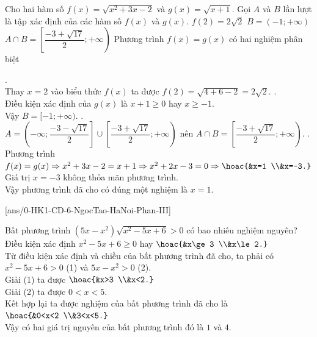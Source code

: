 \begin{ex}%
Cho hai hàm số $f(x)=\sqrt{{{x}^{2}}+3x-2}$ và $g(x)=\sqrt{x+1}$. Gọi $A$ và $B$ lần lượt là tập xác định của các hàm số $f(x)$ và $g(x)$.
\choiceTF
{\True $f(2)=2\sqrt{2}$}
{$B=(-1;+\infty)$}
{\True $A\cap B=\left [\dfrac{-3+\sqrt{17}}{2};+\infty\right)$}
{Phương trình $f(x)=g(x)$ có hai nghiệm phân biệt}
\loigiai
{\begin{itemchoice}
.\\
Thay $x=2$ vào biểu thức $f(x)$ ta được $f(2)=\sqrt{4+6-2}=2\sqrt{2}$.
.\\
Điều kiện xác định của $g(x)$ là $x+1\ge 0$ hay $x\ge -1$.\\
Vậy $B=[-1;+\infty)$.
.\\
$A=\left(-\infty;\dfrac {-3-\sqrt{17}}{2}\right]\cup \left[\dfrac {-3+\sqrt{17}}{2};+\infty\right)$ nên $A\cap B=\left[\dfrac {-3+\sqrt{17}}{2};+\infty\right)$.
.\\
Phương trình $f(x)=g(x)\Rightarrow x^2+3x-2=x+1\Rightarrow x^2+2x-3=0\Rightarrow \hoac{&x=1 \\&x=-3.}$\\
Giá trị $x=-3$ không thỏa mãn phương trình.\\
Vậy phương trình đã cho có đúng một nghiệm là $x=1$.
\end{itemchoice}}
\end{ex}

\caukq
{}[ans/0-HK1-CD-6-NgocTao-HaNoi-Phan-III]
\setcounter{ex}{0}
\begin{ex}%
Bất phương trình $\left(5x-x^2\right)\sqrt{x^2-5x+6}>0$ có bao nhiêu nghiệm nguyên?
\loigiai
{Điều kiện xác định $x^2-5x+6\ge 0$ hay $\hoac{&x\ge 3 \\&x\le 2.}$\\
Từ điều kiện xác định và chiều của bất phương trình đã cho, ta phải có
$x^2-5x+6>0$ (1) và $5x-x^2>0$ (2).\\
Giải (1) ta được $\hoac{&x>3 \\&x<2.}$\\
Giải (2) ta được $0<x<5$.\\
Kết hợp lại ta được nghiệm của bất phương trình đã cho là $\hoac{&0<x<2 \\&3<x<5.}$\\
Vậy có hai giá trị nguyên của bất phương trình đó là $1$ và $4$.}
\end{ex}

